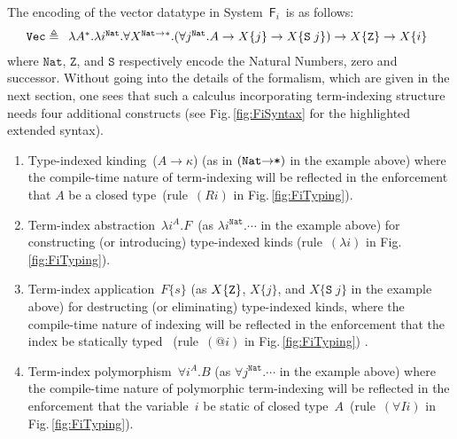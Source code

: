 \documentclass{llncs}
\newcommand{\Fig}[1]{Fig.\,\ref{fig:#1}}
\newcommand{\Fi}{\ensuremath{\mathsf{F}_i}}
\begin{document}
The encoding of the vector datatype in System~\Fi\ is as follows: 
\begin{equation*}\label{FiVecType}
\texttt{{Vec}}
\triangleq
\begin{array}[t]{l}
\lambda A^\mathtt{*}.\lambda
i^{\texttt{{Nat}}}.  \forall X^{\texttt{{Nat}}\to\mathtt{*}}.
  (\forall j^{\texttt{{Nat}}}.A\to X\{j\}\to X\{\texttt{{S}}\; j\})
  \to X\{\texttt{{Z}}\}
    \to X\{i\}
\end{array}
\end{equation*}
where $\texttt{{Nat}}$, $\mathtt Z$, and $\mathtt S$ respectively encode
the Natural Numbers, zero and successor.
Without going into the details of the formalism, which are given in the
next section, one sees that such a calculus incorporating term-indexing
structure needs four additional constructs (see \Fig{FiSyntax} for the
highlighted extended syntax).
\begin{enumerate}
\item 
  Type-indexed kinding~($A\to\kappa$) (as in $(\texttt{{Nat}\ensuremath{\to}*})$
  in the example above) where the compile-time nature of term-indexing
  will be reflected in the enforcement that $A$ be a closed
  type~(rule~$(Ri)$ in \Fig{FiTyping}).

\item 
  Term-index abstraction~$\lambda i^A.F$~(as $\lambda
  i^{\texttt{{Nat}}}.\cdots$ in the example above) for constructing (or
  introducing) type-indexed kinds (rule~$(\lambda i)$ in
  \Fig{FiTyping}).  

\item 
  Term-index application~$F\{s\}$ (as $X\{{\tt Z}\}$, $X\{j\}$, and
  $X\{\texttt{S}\;j\}$ in the example above) for destructing (or
  eliminating) type-indexed kinds, where the compile-time nature of
  indexing will be reflected in the enforcement that the index be
  statically typed%
~(rule~$(@i)$ in \Fig{FiTyping}) .

\item 
  Term-index polymorphism~$\forall i^A.B$ (as $\forall
  j^{\texttt{{Nat}}}.\cdots$ in the example above) where the compile-time
  nature of polymorphic term-indexing will be reflected in the enforcement
  that the variable~$i$ be static of closed type~$A$~(rule~$(\forall
  Ii)$ in \Fig{FiTyping}).
\end{enumerate}
\end{document}
